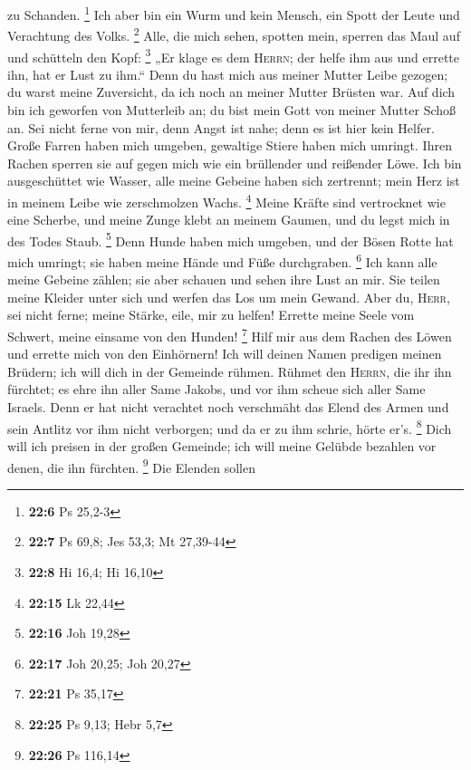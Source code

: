 zu Schanden. \footnote{\textbf{22:6} Ps 25,2-3}  Ich aber
bin ein Wurm und kein Mensch, ein Spott der Leute und Verachtung des
Volks. \footnote{\textbf{22:7} Ps 69,8; Jes 53,3; Mt 27,39-44}
 Alle, die mich sehen, spotten mein, sperren das Maul auf
und schütteln den Kopf: \footnote{\textbf{22:8} Hi 16,4; Hi 16,10}
 „Er klage es dem \textsc{Herrn}; der helfe ihm aus und
errette ihn, hat er Lust zu ihm.``  Denn du hast mich aus
meiner Mutter Leibe gezogen; du warst meine Zuversicht, da ich noch an
meiner Mutter Brüsten war.  Auf dich bin ich geworfen von
Mutterleib an; du bist mein Gott von meiner Mutter Schoß an.
 Sei nicht ferne von mir, denn Angst ist nahe; denn es
ist hier kein Helfer.  Große Farren haben mich umgeben,
gewaltige Stiere haben mich umringt.  Ihren Rachen
sperren sie auf gegen mich wie ein brüllender und reißender Löwe.
 Ich bin ausgeschüttet wie Wasser, alle meine Gebeine
haben sich zertrennt; mein Herz ist in meinem Leibe wie zerschmolzen
Wachs. \footnote{\textbf{22:15} Lk 22,44}  Meine Kräfte
sind vertrocknet wie eine Scherbe, und meine Zunge klebt an meinem
Gaumen, und du legst mich in des Todes Staub. \footnote{\textbf{22:16}
  Joh 19,28}  Denn Hunde haben mich umgeben, und der
Bösen Rotte hat mich umringt; sie haben meine Hände und Füße
durchgraben. \footnote{\textbf{22:17} Joh 20,25; Joh 20,27}
 Ich kann alle meine Gebeine zählen; sie aber schauen und
sehen ihre Lust an mir.  Sie teilen meine Kleider unter
sich und werfen das Los um mein Gewand.  Aber du,
\textsc{Herr}, sei nicht ferne; meine Stärke, eile, mir zu helfen!
 Errette meine Seele vom Schwert, meine einsame von den
Hunden! \footnote{\textbf{22:21} Ps 35,17}  Hilf mir aus
dem Rachen des Löwen und errette mich von den Einhörnern!
 Ich will deinen Namen predigen meinen Brüdern; ich will
dich in der Gemeinde rühmen.  Rühmet den \textsc{Herrn},
die ihr ihn fürchtet; es ehre ihn aller Same Jakobs, und vor ihm scheue
sich aller Same Israels.  Denn er hat nicht verachtet
noch verschmäht das Elend des Armen und sein Antlitz vor ihm nicht
verborgen; und da er zu ihm schrie, hörte er's. \footnote{\textbf{22:25}
  Ps 9,13; Hebr 5,7}  Dich will ich preisen in der großen
Gemeinde; ich will meine Gelübde bezahlen vor denen, die ihn fürchten.
\footnote{\textbf{22:26} Ps 116,14}  Die Elenden sollen
